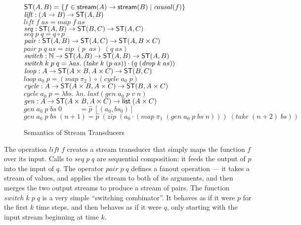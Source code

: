 \begin{figure}
\mbox{}
\begin{tabbing}
$\mathsf{ST}({A}, {B}) = \{{{f \in \mathsf{stream}({A}) \to \mathsf{stream}({B})}\;|\;{\mathit{causal}(f)}}\}$\\[1em]

$\mathit{lift} : (A \to B) \to \mathsf{ST}({A}, {B})$ \\
$\mathit{lift}\;f\;as = \mathit{map}\;f\;as$ \\[1em]

$\mathit{seq}  : \mathsf{ST}({A}, {B}) \to \mathsf{ST}({B}, {C}) \to \mathsf{ST}({A}, {C})$ \\
$\mathit{seq}\;p\;q = q \circ p$ \\[1em]

$\mathit{pair}  : \mathsf{ST}({A}, {B}) \to \mathsf{ST}({A}, {C}) \to \mathsf{ST}({A}, {B \times C})$ \\
$\mathit{pair}\; p\;q\;as = \mathit{zip}\; (p\;\;as)\;(q\;as)$\\[1em]

$\mathit{switch} : \mathbb{N} \to \mathsf{ST}({A}, {B}) \to \mathsf{ST}({A}, {B}) \to \mathsf{ST}({A}, {B})$ \\
$\mathit{switch}\;k\;p\;q = \lambda as.\;(\mathit{take}\;k\;(p\;as))\cdot(q\;(\mathit{drop}\;k\;as))$ \\[1em]

$\mathit{loop} : A \to \mathsf{ST}({A\times B}, {A \times C}) \to \mathsf{ST}({B}, {C})$ \\
$\mathit{loop}\;a_0\;p = (\mathit{map}\;\pi_2) \circ (\mathit{cycle}\;a_0\;p)$ \\[1em]

$\mathit{cycle} : A \to \mathsf{ST}({A\times B}, {A \times C}) \to \mathsf{ST}({B}, {A \times C})$ \\
$\mathit{cycle}\;a_0\;p = \lambda bs.\;\lambda n.\;last(gen\;a_0\;p\;v\;n)$ \\[1em]

$\mathit{gen} : A \to \mathsf{ST}({A\times B}, {A \times C}) \to \mathsf{list}\;{(A \times C)}$\\
$\mathit{gen}\;a_0\;p\;bs\;0 \qquad\;\; = \hat{p}\; [(a_0, bs_0)]$ \\
$\mathit{gen}\;a_0\;p\;bs\;(n+1) = \hat{p}\;(\mathit{zip} \;(a_0 \cdot (\mathit{map}\;\pi_1\;(\mathit{gen}\;a_0\;p\;bs\;n)))\;
                                        (\mathit{take}\;(n+2)\;bs))$ 
\end{tabbing}
\caption{Semantics of Stream Transducers}
\label{transducer-semantics}
\end{figure}

The operation $\mathit{lift}\;f$ creates a stream transducer that simply maps
the function $f$ over its input. Calls to $\mathit{seq}\;p\;q$ are sequential
composition: it feeds the output of $p$ into the input of $q$. The
operator $\mathit{pair}\;p\;q$ defines a fanout operation --- it takes a stream
of values, and applies the stream to both of its arguments, and then
merges the two output streams to produce a stream of pairs. The
function $\mathit{switch}\;k\;p\;q$ is a very simple ``switching combinator''.
It behaves as if it were $p$ for the first $k$ time steps, and then
behaves as if it were $q$, only starting with the input stream
beginning at time $k$.

